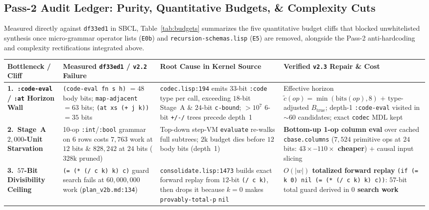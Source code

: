 \documentclass[12pt]{article}
\begin{document}
\subsection{Pass-2 Audit Ledger: Purity, Quantitative Budgets, \& Complexity Cuts}
\label{sec:pass2-audit}

Measured directly against \texttt{df33ed1} in SBCL, Table~\ref{tab:budgets} summarizes the five quantitative budget cliffs that blocked unwhitelisted synthesis once micro-grammar operator lists (\texttt{E0b}) and \texttt{recursion-schemas.lisp} (\texttt{E5}) are removed, alongside the Pass-2 anti-hardcoding and complexity rectifications integrated above.

\begin{table}[htbp]
\centering
\footnotesize
\setlength{\tabcolsep}{4pt}
\begin{tabular}{@{}L{2.55cm}L{4.35cm}L{4.55cm}L{4.15cm}@{}}
\toprule
\textbf{Bottleneck / Cliff} & \textbf{Measured \texttt{df33ed1} / \texttt{v2.2} Failure} & \textbf{Root Cause in Kernel Source} & \textbf{Verified \texttt{v2.3} Repair \& Cost} \\
\midrule
\textbf{1.~\texttt{:code-eval} / \texttt{:at} Horizon Wall} & \texttt{(code-eval fn s h)} $= 48$ body bits; \texttt{map-adjacent} $= 63$ bits; \texttt{(at xs (+ j k))} $= 35$ bits & \texttt{codec.lisp:194} emits $33$-bit \texttt{:code} type per call, exceeding $18$-bit Stage~A \& $24$-bit \texttt{c-bound}; $>10^7$ $6$-bit \texttt{+/\allowbreak-/\allowbreak*} trees precede depth~1 & Effective horizon $\tilde{c}(op)=\min(\mathrm{bits}(op),8)$ $+$ type-adjusted $B_{\mathrm{true}}$; depth-1 \texttt{:code-eval} visited in $\sim 60$ candidates; exact \texttt{codec} MDL kept \\
\addlinespace[2pt]
\textbf{2.~Stage~A $2,000$-Unit Starvation} & 10-op \texttt{:int}/\texttt{:bool} grammar on $6$ rows costs $7,763$ work at $12$ bits \& $828,242$ at $24$ bits ($328\mathrm{k}$ pruned) & Top-down step-VM \texttt{evaluate} re-walks full subtrees; $2\mathrm{k}$ budget dies before $12$ body bits (depth~1) & \textbf{Bottom-up 1-op column eval} over cached \texttt{cbase.columns} ($7,524$ primitive ops at $24$ bits: \textbf{$43\times$--$110\times$ cheaper}) $+$ causal input slicing \\
\addlinespace[2pt]
\textbf{3.~$57$-Bit Divisibility Ceiling} & \texttt{(= (* (/ c k) k) c)} guard search fails at $60,000,000$ work (\texttt{plan\_v2b.md:134}) & \texttt{consolidate.lisp:1473} builds exact forward replay from $12$-bit \texttt{(/ c k)}, then drops it because $k=0$ makes \texttt{provably-total-p} \texttt{nil} & \textbf{$O(|w|)$ totalized forward replay} \texttt{(if (= k 0) nil (= (* (/ c k) k) c))}: $57$-bit total guard derived in \textbf{$0$ search work} \\

\end{tabular}
\end{table}
\end{document}
